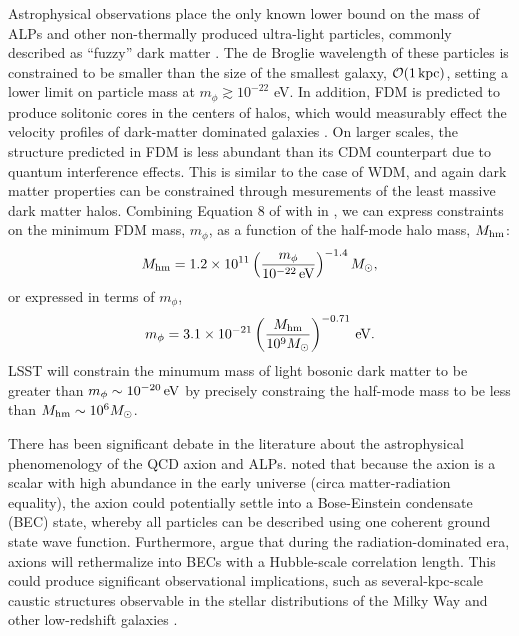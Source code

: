 Astrophysical observations place the only known lower bound on the mass of ALPs and other non-thermally produced ultra-light particles, commonly described as ``fuzzy'' dark matter \citep[FDM; \eg,][]{Hu:2000,Hui:2017}. 
The de Broglie wavelength of these particles is constrained to be smaller than the size of the smallest galaxy, $\mathcal{O}(1\mathrm{\,kpc})$, setting a lower limit on particle mass at $m_\phi \gtrsim 10^{-22}$ eV. 
In addition, FDM is predicted to produce solitonic cores in the centers of halos, which would measurably effect the velocity profiles of dark-matter dominated galaxies \citep{Robles:2012uy,Robles:2018fur,Schive:2014hza,Du:2016aik}. 
On larger scales, the structure predicted in FDM is less abundant than its CDM counterpart due to quantum interference effects.
This is similar to the case of WDM, and again dark matter properties can be constrained through mesurements of the least massive dark matter halos.
Combining Equation 8 of \citet[][]{1703.09126} with  in , we can express constraints on the minimum FDM mass, $m_\phi$, as a function of the half-mode halo mass, $M_{\rm hm}$:
\begin{equation}
M_{\rm hm} = 1.2 \times 10^{11} \left( \frac{m_\phi}{10^{-22}\mathrm{\,eV}} \right)^{-1.4} M_\odot,
\end{equation}
or expressed in terms of $m_\phi$, 
\begin{equation}
m_\phi = 3.1 \times 10^{-21} \left( \frac{M_{\rm hm}}{10^{9}M_\odot} \right)^{-0.71} \mathrm{\,eV}.
\end{equation}
LSST will constrain the minumum mass of light bosonic dark matter to be greater than $m_\phi \sim 10^{-20} \mathrm{\,eV}$ by precisely constraing the half-mode mass to be less than $M_{\rm hm} \sim 10^{6} M_\odot$.


There has been significant debate in the literature about the astrophysical phenomenology of the QCD axion and ALPs.
\citet{Sikivie:2009} noted that because the axion is a scalar with high abundance in the early universe (circa matter-radiation equality), the axion could potentially settle into a Bose-Einstein condensate (BEC) state, whereby all particles can be described using one coherent ground state wave function. 
Furthermore, \citet{Sikivie:2009} argue that during the radiation-dominated era, axions will rethermalize into BECs with a Hubble-scale correlation length.
This could produce significant observational implications, such as several-kpc-scale caustic structures observable in the stellar distributions of the Milky Way and other low-redshift galaxies \citep[\eg,][]{Natarajan:2006,0805.4556,Rindler-Daller:2013zxa}.


